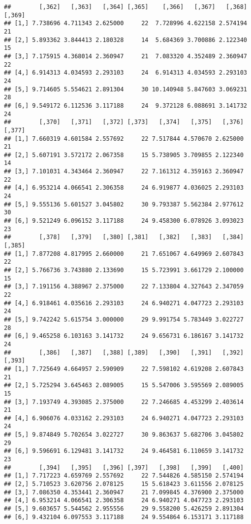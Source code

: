 \documentclass[]{article}
\begin{document}
\begin{verbatim}
##        [,362]   [,363]   [,364] [,365]    [,366]   [,367]   [,368] [,369]
## [1,] 7.738696 4.711343 2.625000     22  7.728996 4.622158 2.574194     21
## [2,] 5.893362 3.844413 2.180328     14  5.684369 3.700886 2.122340     15
## [3,] 7.175915 4.368014 2.360947     21  7.083320 4.352489 2.360947     22
## [4,] 6.914313 4.034593 2.293103     24  6.914313 4.034593 2.293103     24
## [5,] 9.714605 5.554621 2.891304     30 10.140948 5.847603 3.069231     28
## [6,] 9.549172 6.112536 3.117188     24  9.372128 6.088691 3.141732     24
##        [,370]   [,371]   [,372] [,373]   [,374]   [,375]   [,376] [,377]
## [1,] 7.660319 4.601584 2.557692     22 7.517844 4.570670 2.625000     21
## [2,] 5.607191 3.572172 2.067358     15 5.738905 3.709855 2.122340     14
## [3,] 7.101031 4.343464 2.360947     22 7.161312 4.359163 2.360947     22
## [4,] 6.953214 4.066541 2.306358     24 6.919877 4.036025 2.293103     24
## [5,] 9.555136 5.601527 3.045802     30 9.793387 5.562384 2.977612     30
## [6,] 9.521249 6.096152 3.117188     24 9.458300 6.078926 3.093023     23
##        [,378]   [,379]   [,380] [,381]   [,382]   [,383]   [,384] [,385]
## [1,] 7.877208 4.817995 2.660000     21 7.651067 4.649969 2.607843     22
## [2,] 5.766736 3.743880 2.133690     15 5.723991 3.661729 2.100000     15
## [3,] 7.191156 4.388967 2.375000     22 7.133804 4.327643 2.347059     22
## [4,] 6.918461 4.035616 2.293103     24 6.940271 4.047723 2.293103     24
## [5,] 9.742242 5.615754 3.000000     29 9.991754 5.783449 3.022727     28
## [6,] 9.465258 6.103163 3.141732     24 9.656731 6.186167 3.141732     24
##        [,386]   [,387]   [,388] [,389]   [,390]   [,391]   [,392] [,393]
## [1,] 7.725649 4.664957 2.590909     22 7.598102 4.619208 2.607843     21
## [2,] 5.725294 3.645463 2.089005     15 5.547006 3.595569 2.089005     15
## [3,] 7.193749 4.393085 2.375000     22 7.246685 4.453299 2.403614     21
## [4,] 6.906076 4.033162 2.293103     24 6.940271 4.047723 2.293103     24
## [5,] 9.874849 5.702654 3.022727     30 9.863637 5.682706 3.045802     29
## [6,] 9.596691 6.129481 3.141732     24 9.464581 6.110659 3.141732     23
##        [,394]   [,395]   [,396] [,397]   [,398]   [,399]   [,400]
## [1,] 7.717223 4.659769 2.557692     22 7.544826 4.585150 2.574194
## [2,] 5.710523 3.620756 2.078125     15 5.618423 3.611556 2.078125
## [3,] 7.086350 4.353441 2.360947     21 7.099845 4.376900 2.375000
## [4,] 6.953214 4.066541 2.306358     24 6.940271 4.047723 2.293103
## [5,] 9.603657 5.544562 2.955556     29 9.558200 5.426259 2.891304
## [6,] 9.432104 6.097553 3.117188     24 9.554864 6.153171 3.117188
\end{verbatim}
\end{document}
